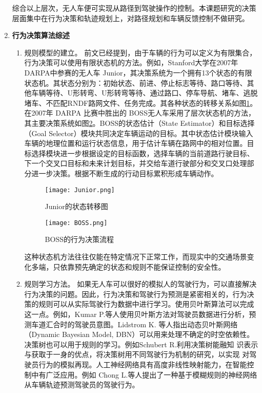 \begin{enumerate}[wide=\parindent]
\begin{enumerate}[label=(\arabic*), wide=\parindent]
\end{enumerate}

综合以上层次，无人车便可实现从路径到驾驶操作的控制。本课题研究的决策层面集中在行为决策和轨迹规划上，对路径规划和车辆反馈控制不做研究。

\item \textbf{行为决策算法综述}
\label{sec:behavior}

\begin{enumerate}[label=(\arabic*),wide=\parindent]
\item 规则模型的建立。
前文已经提到，由于车辆的行为可以定义为有限集合，行为决策可以使用有限状态机的方法。例如，Stanford大学在2007年 DARPA中参赛的无人车 Junior，其决策系统为一个拥有13个状态的有限状态机\cite{Montemerlo2008Junior}。其状态分别为：初始状态、前进、停止标志等待、路口等待、其他车辆等待、U形转弯、U形转弯等待、通过路口、停车导航、堵车、逃脱堵车、不匹配RNDF路网文件、任务完成。其各种状态的转移关系如图\ref{fig:junior}。在2007年 DARPA 比赛中胜出的 BOSS\cite{Baker2008Traffic}无人车采用了层次状态机的方法，其主要决策系统如图\ref{fig:boss}。BOSS的状态估计（State Estimator）和目标选择（Goal Selector）模块共同决定车辆运动的目标。其中状态估计模块输入车辆的地理位置和运行状态信息，用于估计车辆在路网中的相对位置。目标选择模块进一步根据设定的目标函数，选择车辆的当前道路行驶目标、下一个交叉口目标和未来计划目标，并交给车道行驶部分和交叉口处理部分进一步决策。根据不断生成的行动目标累积形成车辆动作。

\begin{figure}[htbp]
\centering
\texttt{[image: Junior.png]}
\caption[Junior的状态转移图]{Junior的状态转移图\cite{Montemerlo2008Junior}}
\label{fig:junior}
\end{figure}

\begin{figure}[htbp]
\centering
\texttt{[image: BOSS.png]}
\caption[BOSS的行为决策流程]{BOSS的行为决策流程\cite{Baker2008Traffic}}
\label{fig:boss}
\end{figure}

这种状态机方法往往仅能在特定情况下正常工作，而现实中的交通场景变化多端，只依靠预先确定的状态和规则不能保证控制的安全性。

\item 规则学习方法。
如果无人车可以很好的模拟人的驾驶行为，可以直接解决行为决策的问题。因此，行为决策和驾驶行为预测是紧密相关的，行为决策的规则可以从实际驾驶行为数据中进行学习。使用贝叶斯算法可以完成这一点。例如，Kumar P.等人\cite{Kumar2013Learning}使用贝叶斯方法对驾驶员数据进行分析，预测车道汇合时的驾驶员意图。Lidstrom K. 等人\cite{Lidstrom2008Model}指出动态贝叶斯网络（Dynamic Bayesian Model, DBN）可以用来处理不确定的时空依赖性。决策树也可以用于规则的学习。例如Schubert R.\cite{Schubert2012Evaluating}利用决策树能融知 识表示与获取于一身的优点，将决策树用不同驾驶行为机制的研究，以实现 对驾驶员行为的模拟再现。人工神经网络具有高度非线性映射能力，在智能控制中有广泛应用。例如 Chong L.等人\cite{Chong2013A}提出了一种基于模糊规则的神经网络从车辆轨迹预测驾驶员的驾驶行为。


\end{enumerate}
\end{enumerate}
